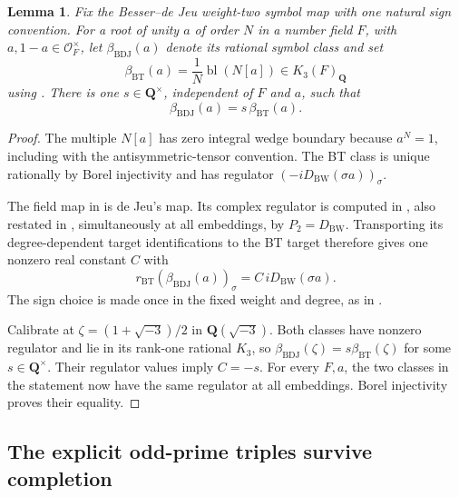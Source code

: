 \documentclass[11pt,a4paper]{article}
\newtheorem{lemma}[theorem]{Lemma}
\theoremstyle{remark}
\newcommand{\Q}{\mathbf Q}
\newcommand{\OO}{\mathcal O}
\begin{document}
\begin{lemma}\label{lem:cyclotomicnormalization}
Fix the Besser--de Jeu weight-two symbol map with one natural
sign convention. For a root of unity $a$ of order $N$ in a
number field $F$, with $a,1-a\in\OO_F^\times$, let
$\beta_{\mathrm{BDJ}}(a)$ denote its rational symbol class and set
\[
 \beta_{\mathrm{BT}}(a)=\frac1N\operatorname{bl}(N[a])
       \in K_3(F)_{\Q}
\]
using \cite[Theorem~4.9]{BunkeTamme}.
There is one $s\in\Q^\times$, independent of $F$ and $a$, such that
\[
 \beta_{\mathrm{BDJ}}(a)=s\,\beta_{\mathrm{BT}}(a).
\]
\end{lemma}
\begin{proof}
The multiple $N[a]$ has zero integral wedge boundary because
$a^N=1$, including with the antisymmetric-tensor convention.
The BT class is unique rationally by Borel injectivity and has
regulator $(-iD_{\mathrm{BW}}(\sigma a))_\sigma$.

The field map in \cite[equation~(1.1), Theorem~1.10(1)]{BesserDeJeu}
is de Jeu's map. Its complex regulator is computed in
\cite[Proposition~4.1 and Remark~5.2]{DeJeuWedge}, also restated in \cite[Theorem~2.3]{DeJeuCurves}, simultaneously
at all embeddings, by $P_2=D_{\mathrm{BW}}$.
Transporting its degree-dependent target identifications to the
BT target therefore gives one nonzero real constant $C$ with
\[
 r_{\mathrm{BT}}(\beta_{\mathrm{BDJ}}(a))_\sigma
       =C\,iD_{\mathrm{BW}}(\sigma a).
\]
The sign choice is made once in the fixed weight and degree,
as in \cite[Remark~1.7]{BesserDeJeu}.

Calibrate at $\zeta=(1+\sqrt{-3})/2$ in $\Q(\sqrt{-3})$.
Both classes have nonzero regulator and lie in its rank-one
rational $K_3$, so
$\beta_{\mathrm{BDJ}}(\zeta)=s\beta_{\mathrm{BT}}(\zeta)$
for some $s\in\Q^\times$.
Their regulator values imply $C=-s$.
For every $F,a$, the two classes in the statement now have
the same regulator at all embeddings. Borel injectivity proves
their equality.
\end{proof}



\subsection{The explicit odd-prime triples survive completion}
\label{sec:explicitoddcomplete}
\end{document}
